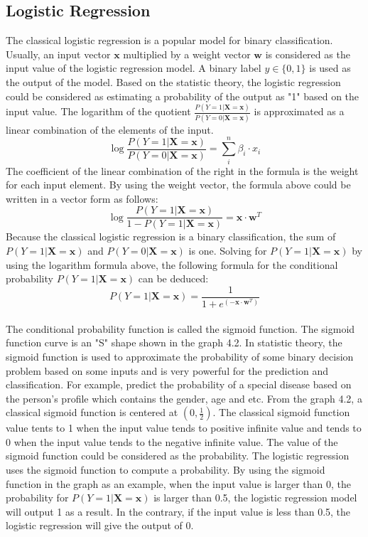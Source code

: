 \subsection{Logistic Regression}
The classical logistic regression is a popular model for binary classification. Usually, an input vector $\textbf{x}$ multiplied  by a weight vector $\textbf{w}$ is considered as the input value of the logistic regression model. A binary label $y \in \{0,1\}$ is used as the output of the model. Based on the statistic theory, the logistic regression could be considered as estimating a probability of the output as "1" based on the input value. The logarithm of the quotient $\frac{P(Y=1|\textbf{X}=\textbf{x})}{P(Y=0|\textbf{X}=\textbf{x})}$ is approximated as a linear combination of the elements of the input. 
\begin{equation}
\log \frac{P(Y=1|\textbf{X}=\textbf{x})}{P(Y=0|\textbf{X}=\textbf{x})} = \sum_i^n \beta_i \cdot x_i 
\end{equation}
The coefficient of the linear combination of the right in the formula is the weight for each input element. By using the weight vector, the formula above could be written in a vector form as follows:
\begin{equation}
 \log \frac{P(Y=1|\textbf{X}=\textbf{x})}{1-P(Y=1|\textbf{X}=\textbf{x})}=\textbf{x} \cdot \textbf{w}^T
\end{equation}
Because the classical logistic regression is a binary classification, the sum of $P(Y=1|\textbf{X}=\textbf{x})$ and $P(Y=0|\textbf{X}=\textbf{x})$ is one. Solving for $P(Y=1|\textbf{X}=\textbf{x})$ by using the logarithm formula above, the following formula for the conditional probability $P(Y=1|\textbf{X}=\textbf{x})$ can be deduced:
\begin{equation}
P(Y=1|\textbf{X}=\textbf{x}) = \frac{1}{1+e^{(-\textbf{x} \cdot \textbf{w}^T)}}
\end{equation}
\\
The conditional probability function is called the sigmoid function. The sigmoid function curve is an "S" shape shown in the graph 4.2. In statistic theory, the sigmoid function is used to approximate the probability of some binary decision problem based on some inputs and is very powerful for the prediction and classification. For example, predict the probability of a special disease based on the person's profile which contains the gender, age and etc. From the graph 4.2, a classical sigmoid function is centered at $(0,\frac{1}{2})$.  The classical sigmoid function value tents to 1 when the input value tends to positive infinite value and tends to 0 when the input value tends to the negative infinite value. The value of the sigmoid function could be considered as the probability. The logistic regression uses the sigmoid function to compute a probability. By using the sigmoid function in the graph as an example, when the input value is larger than 0, the probability for $P(Y=1|\textbf{X}=\textbf{x})$ is larger than 0.5, the logistic regression model will output 1 as a result. In the contrary, if the input value is less than 0.5, the logistic regression will give the output of 0. 


